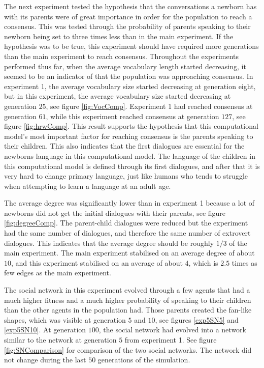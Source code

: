 The next experiment tested the hypothesis that the conversations a newborn has with its parents were of great importance in order for the population to reach a consensus. This was tested through the probability of parents speaking to their newborn being set to three times less than in the main experiment. If the hypothesis was to be true, this experiment should have required more generations than the main experiment to reach consensus. Throughout the experiments performed thus far, when the average vocabulary length started decreasing, it seemed to be an indicator of that the population was approaching consensus. In experiment 1, the average vocabulary size started decreasing at generation eight, but in this experiment, the average vocabulary size started decreasing at generation $25$, see figure \ref{fig:VocComp}. Experiment 1 had reached consensus at generation $61$, while this experiment reached consensus at generation $127$, see figure \ref{fig:hrwComp}. This result supports the hypothesis that this computational model's most important factor for reaching consensus is the parents speaking to their children. This also indicates that the first dialogues are essential for the newborns language in this computational model. The language of the children in this computational model is defined through its first dialogues, and after that it is very hard to change primary language, just like humans who tends to struggle when attempting to learn a language at an adult age. 

The average degree was significantly lower than in experiment 1 because a lot of newborns did not get the initial dialogues with their parents, see figure \ref{fig:degreeComp}. The parent-child dialogues were reduced but the experiment had the same number of dialogues, and therefore the same number of extrovert dialogues. This indicates that the average degree should be roughly $1/3$ of the main experiment. The main experiment stabilised on an average degree of about $10$, and this experiment stabilised on an average of about $4$, which is $2.5$ times as few edges as the main experiment.

The social network in this experiment evolved through a few agents that had a much higher fitness and a much higher probability of speaking to their children than the other agents in the population had. Those parents created the fan-like shapes, which was visible at generation $5$ and $10$, see figures \ref{exp5SN5} and \ref{exp5SN10}. At generation $100$, the social network had evolved into a network similar to the network at generation $5$ from experiment 1. See figure \ref{fig:SNComparison} for comparison of the two social networks. The network did not change during the last $50$ generations of the simulation.

